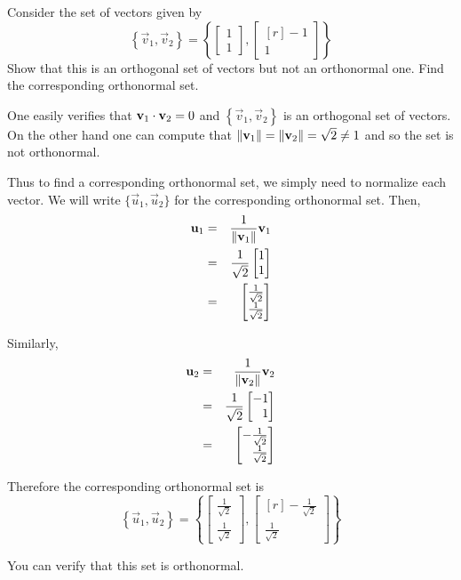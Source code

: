 \documentclass{ximera}
\begin{document}
\begin{example}\label{ex:orthonormalset}
Consider the set of vectors  given by
\[
\left\{ \vec{v}_1, \vec{v}_2 \right\} = \left\{
\begin{bmatrix}
1 \\
1
\end{bmatrix},
\begin{bmatrix*}[r]
-1 \\
1
\end{bmatrix*}
\right\}
\]
Show that this is an orthogonal set of vectors  but not an orthonormal one. Find the corresponding orthonormal set.

\begin{explanation}
One easily verifies that $\mathbf{v}_1 \cdot \mathbf{v}_2 = 0$ and
$\left\{ \vec{v}_1, \vec{v}_2 \right\}$ is an orthogonal set of
vectors. On the other hand one can compute that ${\left\lVert\mathbf{v}_1\right\rVert}= {\left\lVert\mathbf{v}_2\right\rVert} =
\sqrt{2} \neq 1$ and so the set is not orthonormal.

Thus to find a corresponding orthonormal set, we simply need to
normalize each vector. We will write $\{ \vec{u}_1, \vec{u}_2 \}$
for the corresponding orthonormal set. Then,
\begin{eqnarray*}
\mathbf{u}_1 &=& \frac{1}{\left\lVert\mathbf{v}_1\right\rVert}\mathbf{v}_1\\
&=& \frac{1}{\sqrt{2}} \begin{bmatrix}
1 \\
1
\end{bmatrix} \\
&=&
\begin{bmatrix}
\frac{1}{\sqrt{2}} \\
\frac{1}{\sqrt{2}}
\end{bmatrix}
\end{eqnarray*}

Similarly,
\begin{eqnarray*}
\vec{u}_2 &=& \frac{1}{\norm{\vec{v}_2}}\vec{v}_2\\
&=& \frac{1}{\sqrt{2}} \begin{bmatrix*}[r]
-1 \\
1
\end{bmatrix*} \\
&=&
\begin{bmatrix*}[r]
-\frac{1}{\sqrt{2}} \\
\frac{1}{\sqrt{2}}
\end{bmatrix*}
\end{eqnarray*}

Therefore the corresponding orthonormal set is
\[
\left\{ \vec{u}_1, \vec{u}_2 \right\} =
\left\{
\begin{bmatrix}
\frac{1}{\sqrt{2}} \\
\frac{1}{\sqrt{2}}
\end{bmatrix},
\begin{bmatrix*}[r]
-\frac{1}{\sqrt{2}} \\
\frac{1}{\sqrt{2}}
\end{bmatrix*}
\right\}
\]

You can verify that this set is orthonormal.
\end{explanation}
\end{example}
\end{document}
